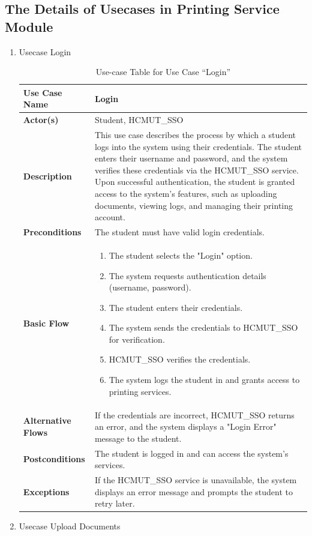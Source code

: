 \newpage
\subsection{The Details of Usecases in Printing Service Module}

\begin{enumerate}\bfseries
    \item Usecase Login
    
       \begin{table}[h!]
        \centering
        \renewcommand{\arraystretch}{1.8}
        \begin{tabular}{|>{\centering\arraybackslash}m{3cm}|>{\raggedright\arraybackslash}m{10cm}|}
        \hline
        \textbf{Use Case Name} & Login \\ \hline
        \textbf{Actor(s)} & Student, HCMUT\_SSO \\ \hline
        \textbf{Description} & This use case describes the process by which a student logs into the system using their credentials. The student enters their username and password, and the system verifies these credentials via the HCMUT\_SSO service. Upon successful authentication, the student is granted access to the system’s features, such as uploading documents, viewing logs, and managing their printing account. \\ \hline
        \textbf{Preconditions} & The student must have valid login credentials. \\ \hline [2ex]
        \textbf{Basic Flow} &
        \begin{enumerate}
            \item The student selects the "Login" option.
            \item The system requests authentication details (username, password).
            \item The student enters their credentials.
            \item The system sends the credentials to HCMUT\_SSO for verification.
            \item HCMUT\_SSO verifies the credentials.
            \item The system logs the student in and grants access to printing services.
        \end{enumerate} \\ \hline
        \textbf{Alternative Flows} & If the credentials are incorrect, HCMUT\_SSO returns an error, and the system displays a "Login Error" message to the student. \\ \hline
        \textbf{Postconditions} & The student is logged in and can access the system’s services. \\ \hline
        \textbf{Exceptions} & If the HCMUT\_SSO service is unavailable, the system displays an error message and prompts the student to retry later. \\ [2ex] \hline
        \end{tabular}
        \caption{Use-case Table for Use Case “Login”}
        \label{tab:login_use_case}
        \end{table}
    \newpage
    \item Usecase Upload Documents
    


\end{enumerate}
